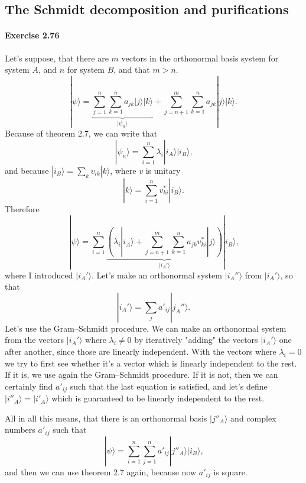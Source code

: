 \documentclass[a4paper,12pt]{article}
\newcommand{\exercise}[1]{\paragraph{Exercise #1}}
\newcommand{\ra}{\rangle}
\begin{document}
    \subsection{The Schmidt decomposition and purifications}

    \exercise{2.76} Let's suppose, that there are $m$ vectors in the orthonormal basis system for system $A$, and $n$ for system $B$, and that $m > n$.
    \begin{equation}
        | \psi \ra = \underbrace{\sum_{j = 1}^{n} \sum_{k = 1}^{n} a_{jk} | j \ra | k \ra}_{ | \psi_n \ra } + \sum_{j = n+1}^{m} \sum_{k = 1}^{n} a_{jk} | j \ra | k \ra \textrm{.}
    \end{equation}
    Because of theorem 2.7, we can write that
    \begin{equation}
        | \psi_n \ra = \sum_{i = 1}^n \lambda_i | i_A \ra | i_B \ra \textrm{,}
    \end{equation}
    and because $| i_B \ra = \sum_k v_{ik} |k \ra$, where $v$ is unitary
    \begin{equation}
        | k \ra = \sum_{i=1}^n v_{ki}^* | i_B \ra \textrm{.}
    \end{equation}
    Therefore
    \begin{equation}
        | \psi \ra = \sum_{i = 1}^n \underbrace{\left( \lambda_i | i_A \ra + \sum_{j=n+1}^m \sum_{k=1}^n a_{jk} v_{ki}^* | j \ra \right)}_{|i_A' \ra} | i_B \ra \textrm{,}
    \end{equation}
    where I introduced $|i_A' \ra$. Let's make an orthonormal system $| i_A'' \ra$ from $|i_A' \ra$, so that
    \begin{equation}
        | i_A' \ra = \sum_j a'_{ij} | j_A'' \ra \textrm{.}
    \end{equation}
    Let's use the Gram--Schmidt procedure. We can make an orthonormal system from the vectors $|i_A' \ra$ where $\lambda_i \neq 0$ by iteratively "adding" the vectors $|i_A' \ra$ one after another, since those are linearly independent. With the vectors where $\lambda_i = 0$ we try to first see whether it's a vector which is linearly independent to the rest. If it is, we use again the Gram--Schmidt procedure. If it is not, then we can certainly find $a'_{ij}$ such that the last equation is satisfied, and let's define $|i''_A \ra = | i'_A \ra$ which is guaranteed to be linearly independent to the rest.

    All in all this means, that there is an orthonormal basis $|j''_A \ra$ and complex numbers $a'_{ij}$ such that
    \begin{equation}
        | \psi \ra = \sum_{i=1}^n \sum_{j=1}^n a'_{ij} |j''_A \ra | i_B \ra \textrm{,}
    \end{equation}
    and then we can use theorem 2.7 again, because now $a'_{ij}$ is square.
\end{document}
